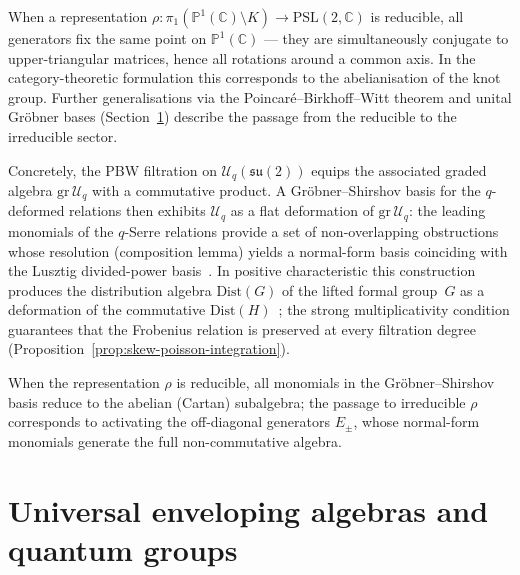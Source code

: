 \begin{remark}
\label{rem:reducible-reps}
When a representation
$\rho\colon\pi_1(\mathbb{P}^1(\mathbb{C})\setminus K)\to\mathrm{PSL}(2,\mathbb{C})$
is reducible, all generators fix the same point on $\mathbb{P}^1(\mathbb{C})$ ---
they are simultaneously conjugate to upper-triangular matrices, hence
all rotations around a common axis.  In the category-theoretic
formulation this corresponds to the abelianisation of the knot group.
Further generalisations via the Poincar\'e--Birkhoff--Witt theorem and
unital Gr\"obner bases (Section~\ref{sec:enveloping-algebras}) describe
the passage from the reducible to the irreducible sector.

Concretely, the PBW filtration on
$\mathcal{U}_q(\mathfrak{su}(2))$ equips the associated graded algebra
$\mathrm{gr}\,\mathcal{U}_q$ with a commutative product.  A
Gr\"obner--Shirshov basis for the $q$-deformed relations then exhibits
$\mathcal{U}_q$ as a flat deformation of $\mathrm{gr}\,\mathcal{U}_q$:
the leading monomials of the $q$-Serre relations provide a set of
non-overlapping obstructions whose resolution (composition lemma) yields
a normal-form basis coinciding with the Lusztig divided-power
basis~\cite{lusztig1993}.  In positive characteristic this construction
produces the distribution algebra $\mathrm{Dist}(G)$ of the lifted
formal group~$G$ as a deformation of the commutative
$\mathrm{Dist}(H)$~\cite{fred2005}; the strong multiplicativity
condition guarantees that the Frobenius relation is preserved at every
filtration degree
(Proposition~\ref{prop:skew-poisson-integration}).

When the representation $\rho$ is reducible, all monomials in the
Gr\"obner--Shirshov basis reduce to the abelian (Cartan) subalgebra; the
passage to irreducible $\rho$ corresponds to activating the
off-diagonal generators $E_\pm$, whose normal-form monomials generate
the full non-commutative algebra.
\end{remark}


\section{Universal enveloping algebras and quantum groups}
\label{sec:enveloping-algebras}

